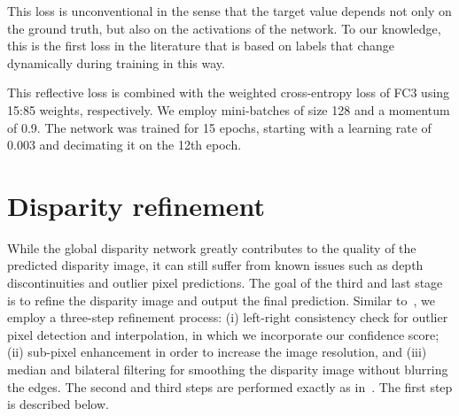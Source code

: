 \documentclass[10pt, twocolumn, letterpaper]{article}
\begin{document}
This loss is unconventional in the sense that the target value depends not only on the ground truth, but also on the activations of the network. To our knowledge, this is the first loss in the literature that is based on labels that change dynamically during training in this way. 

This reflective loss is combined with the weighted cross-entropy loss of FC3 using 15:85 weights, respectively. We employ mini-batches of size 128 and a momentum of 0.9. The network was trained for 15 epochs, starting with a learning rate of 0.003 and decimating it on the 12th epoch.

\section{Disparity refinement}
\label{sec:refinement}
While the global disparity network greatly contributes to the quality of the predicted disparity image, it can still suffer from known issues such as depth discontinuities and outlier pixel predictions. The goal of the third and last stage is to refine the disparity image and output the final prediction. Similar to~\cite{newlecun,mei}, we employ a three-step refinement process: (i) left-right consistency check for outlier pixel detection and interpolation, in which we incorporate our confidence score; (ii) sub-pixel enhancement in order to increase the image resolution, and (iii) median and bilateral filtering for smoothing the disparity image without blurring the edges. The second and third steps are performed exactly as in~\cite{newlecun}. The first step is described below.
\end{document}
